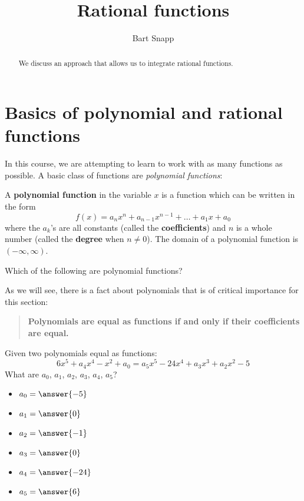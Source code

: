 \documentclass{ximera}
\author{Bart Snapp}
\title[Dig-In:]{Rational functions}
\begin{document}
\begin{abstract}
We discuss an approach that allows us to integrate rational functions.
\end{abstract}
\maketitle

\section{Basics of polynomial and rational functions}

In this course, we are attempting to learn to work with as many
functions as possible. A basic class of functions are \textit{polynomial functions}:

\begin{definition}
  A \textbf{polynomial function} in the variable $x$ is a function
  which can be written in the form
  \[
  f(x) = a_nx^n + a_{n-1}x^{n-1} + \dots + a_1 x + a_0
  \]
  where the $a_k$'s are all constants (called the \textbf{coefficients})
  and $n$ is a whole number (called the \textbf{degree} when $n\ne
  0$). The domain of a polynomial function is $(-\infty,\infty)$.
\end{definition}

\begin{question}
  Which of the following are polynomial functions?
  \begin{selectAll}
  \end{selectAll}
\end{question}

As we will see, there is a fact about polynomials that is of critical
importance for this section:
\begin{quote}
  \textbf{Polynomials are equal as functions if and only if their
    coefficients are equal.}
\end{quote}

\begin{question}
  Given two polynomials equal as functions:
  \[
  6x^5+a_4 x^4 -x^2 + a_0 = a_5 x^5 - 24 x^4 + a_3 x^3 + a_2 x^2 - 5
  \]
  What are $a_0$, $a_1$, $a_2$, $a_3$, $a_4$, $a_5$?
  \begin{prompt}
    \begin{itemize}
    \item $a_0 = \answer{-5}$
    \item $a_1 = \answer{0}$
    \item $a_2 = \answer{-1}$
    \item $a_3 = \answer{0}$
    \item $a_4 = \answer{-24}$
    \item $a_5 = \answer{6}$
    \end{itemize}
  \end{prompt}
\end{question}
\end{document}
